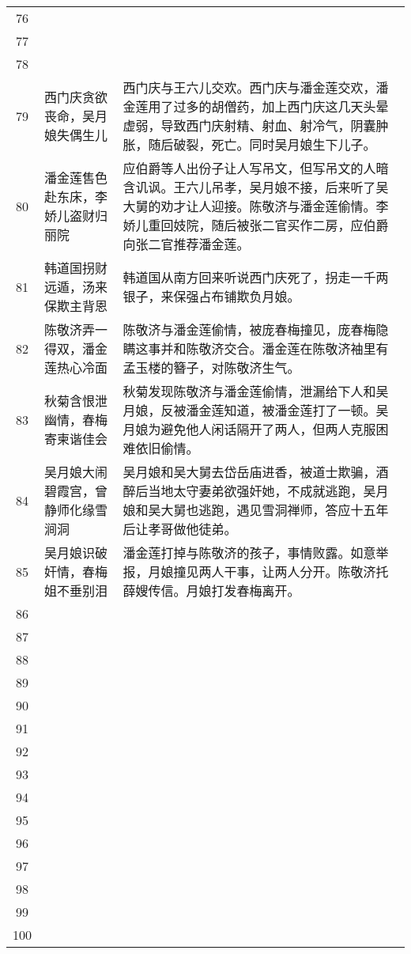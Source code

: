 \begin{longtable}{|c|p{}|p{}|}
76 & & \\
77 & & \\
78 & & \\
79 & 西门庆贪欲丧命，吴月娘失偶生儿 & 西门庆与王六儿交欢。西门庆与潘金莲交欢，潘金莲用了过多的胡僧药，加上西门庆这几天头晕虚弱，导致西门庆射精、射血、射冷气，阴囊肿胀，随后破裂，死亡。同时吴月娘生下儿子。 \\
80 & 潘金莲售色赴东床，李娇儿盗财归丽院 & 应伯爵等人出份子让人写吊文，但写吊文的人暗含讥讽。王六儿吊孝，吴月娘不接，后来听了吴大舅的劝才让人迎接。陈敬济与潘金莲偷情。李娇儿重回妓院，随后被张二官买作二房，应伯爵向张二官推荐潘金莲。 \\
81 & 韩道国拐财远遁，汤来保欺主背恩 & 韩道国从南方回来听说西门庆死了，拐走一千两银子，来保强占布铺欺负月娘。 \\
82 & 陈敬济弄一得双，潘金莲热心冷面 & 陈敬济与潘金莲偷情，被庞春梅撞见，庞春梅隐瞒这事并和陈敬济交合。潘金莲在陈敬济袖里有孟玉楼的簪子，对陈敬济生气。\\
83 & 秋菊含恨泄幽情，春梅寄柬谐佳会 & 秋菊发现陈敬济与潘金莲偷情，泄漏给下人和吴月娘，反被潘金莲知道，被潘金莲打了一顿。吴月娘为避免他人闲话隔开了两人，但两人克服困难依旧偷情。 \\
84 & 吴月娘大闹碧霞宫，曾静师化缘雪涧洞 & 吴月娘和吴大舅去岱岳庙进香，被道士欺骗，酒醉后当地太守妻弟欲强奸她，不成就逃跑，吴月娘和吴大舅也逃跑，遇见雪洞禅师，答应十五年后让孝哥做他徒弟。 \\
85 & 吴月娘识破奸情，春梅姐不垂别泪 & 潘金莲打掉与陈敬济的孩子，事情败露。如意举报，月娘撞见两人干事，让两人分开。陈敬济托薛嫂传信。月娘打发春梅离开。\\
86 & & \\
87 & & \\
88 & & \\
89 & & \\
90 & & \\
91 & & \\
92 & & \\
93 & & \\
94 & & \\
95 & & \\
96 & & \\
97 & & \\
98 & & \\
99 & & \\
100 & & \\


\hline
\end{longtable}
